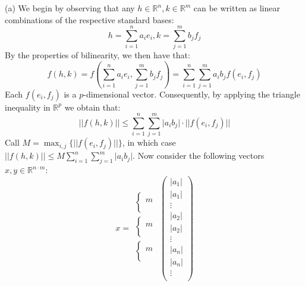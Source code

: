 \begin{solution}

    (a) We begin by observing that any $h \in \mathbb{R}^n, k \in \mathbb{R}^m$ can be written as linear combinations of the respective standard bases:
    $$h = \sum_{i=1}^{n} a_i e_i, k = \sum_{j=1}^{m} b_j f_j$$
    By the properties of bilinearity, we then have that:
    $$f(h, k) = f(\sum_{i=1}^{n} a_i e_i, \sum_{j=1}^{m} b_j f_j) = \sum_{i=1}^{n} \sum_{j=1}^{m} a_i b_j f(e_i, f_j)$$
    Each $f(e_i, f_j)$ is a $p$-dimensional vector.
    Consequently, by applying the triangle inequality in $\mathbb{R}^p$ we obtain that:
    $$\lvert \lvert f(h, k) \rvert \rvert \leq \sum_{i=1}^{n} \sum_{j=1}^{m} \lvert a_i b_j \rvert \cdot \lvert \lvert f(e_i, f_j) \rvert \vert$$
    Call $M = \max_{i, j} \{\lvert \lvert f(e_i, f_j) \rvert \rvert \}$, in which case $\lvert \lvert f(h, k) \rvert \rvert \leq M \sum_{i=1}^{n} \sum_{j=1}^{m} \lvert a_i b_j \rvert$.
    Now consider the following vectors $x, y \in \mathbb{R}^{n\cdot m}$:
    $$x = \begin{array}{lll} 
    \begin{cases} \ \\ m \\ \ \\ \end{cases} \\ \begin{cases} \ \\ m \\ \ \\ \end{cases} \\ \begin{cases} \ \\ m \\ \ \\ \end{cases} \\ \end{array} \begin{pmatrix}
        \lvert a_1 \rvert \\
        \lvert a_1 \rvert \\
        \vdots \\
        \lvert a_2 \rvert \\
        \lvert a_2 \rvert \\
        \vdots \\
        \lvert a_n \rvert \\
        \lvert a_n \rvert \\
        \vdots \\

\end{pmatrix}$$
\end{solution}

